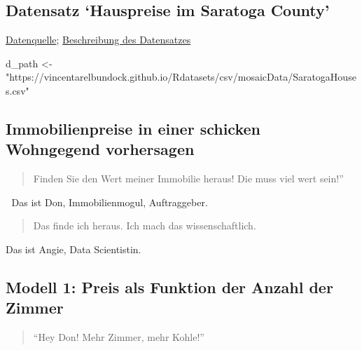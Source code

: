 \documentclass[
  a4paper,
  DIV=11]{scrreprt}
\newenvironment{Shaded}{\begin{snugshade}}{\end{snugshade}}
\newcommand{\NormalTok}[1]{\textcolor[rgb]{0.00,0.23,0.31}{#1}}
\newcommand{\OtherTok}[1]{\textcolor[rgb]{0.00,0.23,0.31}{#1}}
\newcommand{\StringTok}[1]{\textcolor[rgb]{0.13,0.47,0.30}{#1}}
\theoremstyle{definition}
\theoremstyle{remark}
\begin{document}
\hypertarget{datensatz-hauspreise-im-saratoga-county}{%
\subsection{Datensatz `Hauspreise im Saratoga
County'}\label{datensatz-hauspreise-im-saratoga-county}}

\href{https://vincentarelbundock.github.io/Rdatasets/csv/mosaicData/SaratogaHouses.csv}{Datenquelle};
\href{https://vincentarelbundock.github.io/Rdatasets/doc/mosaicData/SaratogaHouses.html}{Beschreibung
des Datensatzes}

\begin{Shaded}
\begin{Highlighting}[]
\NormalTok{d\_path }\OtherTok{\textless{}{-}} \StringTok{"https://vincentarelbundock.github.io/Rdatasets/csv/mosaicData/SaratogaHouses.csv"}
\end{Highlighting}
\end{Shaded}

\hypertarget{immobilienpreise-in-einer-schicken-wohngegend-vorhersagen}{%
\subsection{Immobilienpreise in einer schicken Wohngegend
vorhersagen}\label{immobilienpreise-in-einer-schicken-wohngegend-vorhersagen}}

\begin{quote}
Finden Sie den Wert meiner Immobilie heraus! Die muss viel wert sein!''
\end{quote}

🧑 Das ist Don, Immobilienmogul, Auftraggeber.

\begin{quote}
Das finde ich heraus. Ich mach das wissenschaftlich. 👩 🔬
\end{quote}

Das ist Angie, Data Scientistin.

\hypertarget{modell-1-preis-als-funktion-der-anzahl-der-zimmer}{%
\subsection{Modell 1: Preis als Funktion der Anzahl der
Zimmer}\label{modell-1-preis-als-funktion-der-anzahl-der-zimmer}}

\begin{quote}
``Hey Don! Mehr Zimmer, mehr Kohle!'' 👩 🔬
\end{quote}
\end{document}
